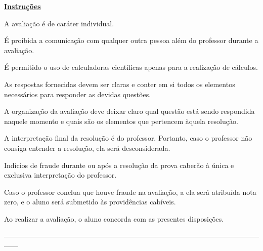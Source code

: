 \noindent\textbf{\large{\underline{Instruções}}}

{\small
\begin{itemize*}
	\item[\textbullet]{A avaliação é de caráter individual.}
	\item[\textbullet]{É proibida a comunicação com qualquer outra pessoa além do professor durante a avaliação.}
	\item[\textbullet]{É permitido o uso de calculadoras científicas apenas para a realização de cálculos.}
	\item[\textbullet]{As respostas fornecidas devem ser claras e conter em si todos os elementos necessários para responder as devidas questões.}
	\item[\textbullet]{A organização da avaliação deve deixar claro qual questão está sendo respondida naquele momento e quais são os elementos que pertencem àquela resolução.}
	\item[\textbullet]{A interpretação final da resolução é do professor. Portanto, caso o professor não consiga entender a resolução, ela será desconsiderada.}
	\item[\textbullet]{Indícios de fraude durante ou após a resolução da prova caberão à única e exclusiva interpretação do professor.}
	\item[\textbullet]{Caso o professor conclua que houve fraude na avaliação, a ela será atribuída nota zero, e o aluno será submetido às providências cabíveis.}
	\item[\textbullet]{Ao realizar a avaliação, o aluno concorda com as presentes disposições.}
\end{itemize*}
}

\begin{center}
	------------------------------------------------------------------------------------------------------------------
\end{center}